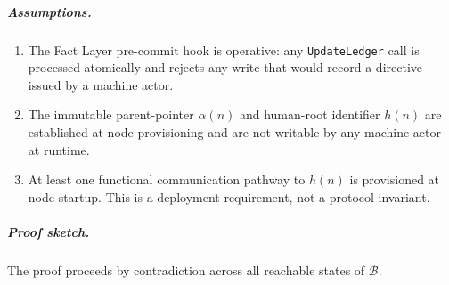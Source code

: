 \subparagraph{Assumptions.}
\begin{enumerate}
\item[\textbf{A1.1}] The Fact Layer pre-commit hook is operative: any \texttt{UpdateLedger} call is processed atomically and rejects any write that would record a directive issued by a machine actor.
\item[\textbf{A1.2}] The immutable parent-pointer $\alpha(n)$ and human-root identifier $h(n)$ are established at node provisioning and are not writable by any machine actor at runtime.
\item[\textbf{A1.3}] At least one functional communication pathway to $h(n)$ is provisioned at node startup. This is a deployment requirement, not a protocol invariant.
\end{enumerate}

\subparagraph{Proof sketch.} The proof proceeds by contradiction across all reachable states of $\mathcal{B}$.


